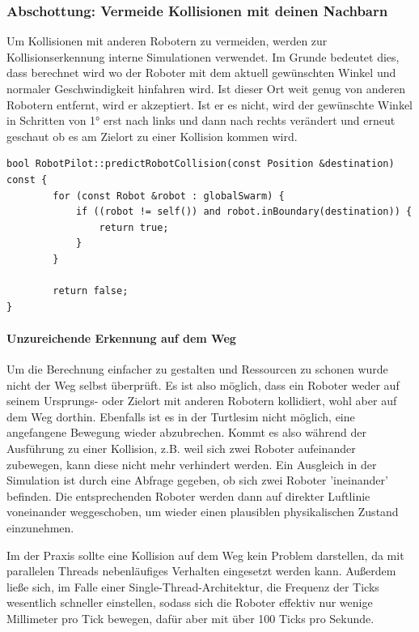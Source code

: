 \subsubsection*{Abschottung: Vermeide Kollisionen mit deinen Nachbarn}

Um Kollisionen mit anderen Robotern zu vermeiden, werden zur Kollisionserkennung interne Simulationen verwendet. Im Grunde bedeutet dies, dass berechnet wird wo der Roboter mit dem aktuell gewünschten Winkel und normaler Geschwindigkeit hinfahren wird. Ist dieser Ort weit genug von anderen Robotern entfernt, wird er akzeptiert. Ist er es nicht, wird der gewünschte Winkel in Schritten von 1° erst nach links und dann nach rechts verändert und erneut geschaut ob es am Zielort zu einer Kollision kommen wird.

\begin{lstlisting}[style=cpp, title=Simulation auf Kollisionen am Zielpunkt]
bool RobotPilot::predictRobotCollision(const Position &destination) const {
        for (const Robot &robot : globalSwarm) {
            if ((robot != self()) and robot.inBoundary(destination)) {
                return true;
            }
        }

        return false;
}
\end{lstlisting}

\paragraph*{Unzureichende Erkennung auf dem Weg}
Um die Berechnung einfacher zu gestalten und Ressourcen zu schonen wurde nicht der Weg selbst überprüft. Es ist also möglich, dass ein Roboter weder auf seinem Ursprungs- oder Zielort mit anderen Robotern kollidiert, wohl aber auf dem Weg dorthin. Ebenfalls ist es in der Turtlesim nicht möglich, eine angefangene Bewegung wieder abzubrechen. Kommt es also während der Ausführung zu einer Kollision, z.B. weil sich zwei Roboter aufeinander zubewegen, kann diese nicht mehr verhindert werden. Ein Ausgleich in der Simulation ist durch eine Abfrage gegeben, ob sich zwei Roboter 'ineinander' befinden. Die entsprechenden Roboter werden dann auf direkter Luftlinie voneinander weggeschoben, um wieder einen plausiblen physikalischen Zustand einzunehmen.

Im der Praxis sollte eine Kollision auf dem Weg kein Problem darstellen, da mit parallelen Threads nebenläufiges Verhalten eingesetzt werden kann. Außerdem ließe sich, im Falle einer Single-Thread-Architektur, die Frequenz der Ticks wesentlich schneller einstellen, sodass sich die Roboter effektiv nur wenige Millimeter pro Tick bewegen, dafür aber mit über 100 Ticks pro Sekunde.%

